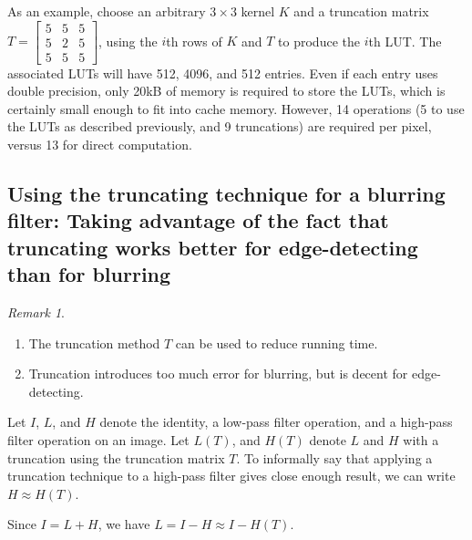 \documentclass[12pt]{amsart}
\theoremstyle{definition}
\theoremstyle{remark}
\newtheorem{rem}[thm]{Remark}
\numberwithin{thm}{section}
\begin{document}
As an example, choose an arbitrary $3\times 3$ kernel $K$ and a truncation matrix $T = \left[\begin{smallmatrix}5 & 5 & 5\\5 & 2 & 5\\ 5 & 5 & 5\end{smallmatrix}\right]$, using the $i$th rows of $K$ and $T$ to produce the $i$th LUT. The associated LUTs will have 512, 4096, and 512 entries. Even if each entry uses double precision, only 20kB of memory is required to store the LUTs, which is certainly small enough to fit into cache memory. However, 14 operations (5 to use the LUTs as described previously, and 9 truncations) are required per pixel, versus 13 for direct computation. 

\subsection{Using the truncating technique for a blurring filter: Taking advantage of the fact that truncating works better for edge-detecting than for blurring}

\begin{rem}\label{rem:sharpening_vs_blurring}
\begin{enumerate}
\item The truncation method $T$ can be used to reduce running time.
\item Truncation introduces too much error for blurring, but is decent for edge-detecting.
\end{enumerate}
\end{rem}

Let $I$, $L$, and $H$ denote the identity, a low-pass filter operation, and a high-pass filter operation on an image.
Let $L(T)$, and $H(T)$ denote $L$ and $H$ with a truncation using the truncation matrix $T$.
To informally say that applying a truncation technique to a high-pass filter gives close enough result, we can write $H \approx H(T)$.

Since $I = L + H$, we have
$L = I - H \approx I - H(T)$.
\end{document}
